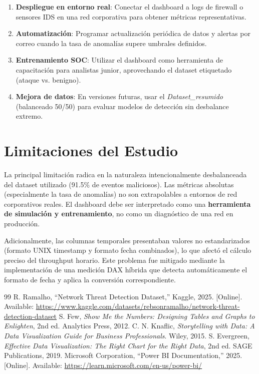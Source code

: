 \documentclass[conference]{IEEEtran}
\begin{document}
\begin{enumerate}
    \item \textbf{Despliegue en entorno real}: Conectar el dashboard a logs de firewall o sensores IDS en una red corporativa para obtener m\'etricas representativas.
    \item \textbf{Automatizaci\'on}: Programar actualizaci\'on peri\'odica de datos y alertas por correo cuando la tasa de anomal\'ias supere umbrales definidos.
    \item \textbf{Entrenamiento SOC}: Utilizar el dashboard como herramienta de capacitaci\'on para analistas junior, aprovechando el dataset etiquetado (ataque vs. benigno).
    \item \textbf{Mejora de datos}: En versiones futuras, usar el \textit{Dataset\_resumido} (balanceado 50/50) para evaluar modelos de detecci\'on sin desbalance extremo.
\end{enumerate}

\section{Limitaciones del Estudio}

La principal limitaci\'on radica en la naturaleza intencionalmente desbalanceada del dataset utilizado (91.5\% de eventos maliciosos). Las m\'etricas absolutas (especialmente la tasa de anomal\'ias) no son extrapolables a entornos de red corporativos reales. El dashboard debe ser interpretado como una \textbf{herramienta de simulaci\'on y entrenamiento}, no como un diagn\'ostico de una red en producci\'on.

Adicionalmente, las columnas temporales presentaban valores no estandarizados (formato UNIX timestamp y formato fecha combinados), lo que afect\'o el c\'alculo preciso del throughput horario. Este problema fue mitigado mediante la implementaci\'on de una medici\'on DAX h\'ibrida que detecta autom\'aticamente el formato de fecha y aplica la conversi\'on correspondiente.

\begin{thebibliography}{99}
 R. Ramalho, ``Network Threat Detection Dataset,'' Kaggle, 2025. [Online]. Available: \url{https://www.kaggle.com/datasets/rebsonramalho/network-threat-detection-dataset}
 S. Few, \textit{Show Me the Numbers: Designing Tables and Graphs to Enlighten}, 2nd ed. Analytics Press, 2012.
 C. N. Knaflic, \textit{Storytelling with Data: A Data Visualization Guide for Business Professionals}. Wiley, 2015.
 S. Evergreen, \textit{Effective Data Visualization: The Right Chart for the Right Data}, 2nd ed. SAGE Publications, 2019.
 Microsoft Corporation, ``Power BI Documentation,'' 2025. [Online]. Available: \url{https://learn.microsoft.com/en-us/power-bi/}
\end{thebibliography}
\end{document}
